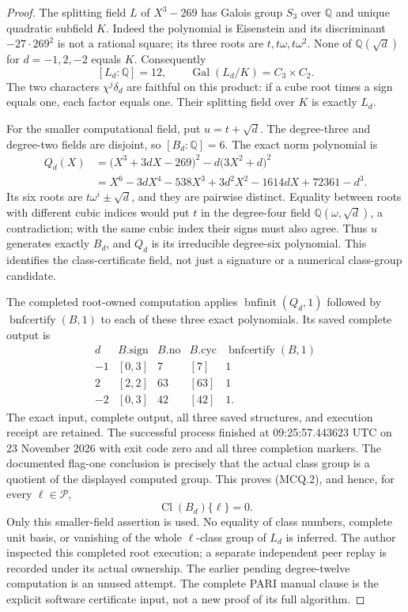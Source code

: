 \begin{proof}
The splitting field $L$ of $X^3-269$ has Galois group $S_3$
over $\mathbb Q$ and unique quadratic subfield $K$.
Indeed the polynomial is Eisenstein and its discriminant
$-27\cdot269^2$ is not a rational square; its three roots are
$t,t\omega,t\omega^2$.  None of $\mathbb Q(\sqrt d)$ for
$d=-1,2,-2$ equals $K$.  Consequently
\[
 [L_d:\mathbb Q]=12,\qquad
 \operatorname{Gal}(L_d/K)=C_3\times C_2.      \tag{MCQ.9}
\]
The two characters $\chi^j\delta_d$ are faithful on this
product: if a cube root times a sign equals one, each factor
equals one.  Their splitting field over $K$ is exactly $L_d$.

For the smaller computational field, put $u=t+\sqrt d$.
The degree-three and degree-two fields are disjoint, so
$[B_d:\mathbb Q]=6$.  The exact norm polynomial is
\[
 \begin{split}
 Q_d(X)&=\bigl(X^3+3dX-269\bigr)^2-d\bigl(3X^2+d\bigr)^2\\
 &=X^6-3dX^4-538X^3+3d^2X^2-1614dX+72361-d^3.
 \end{split}
 \tag{MCQ.10}
\]
Its six roots are $t\omega^i\pm\sqrt d$, and they are
pairwise distinct.  Equality between roots with different
cubic indices would put $t$ in the degree-four field
$\mathbb Q(\omega,\sqrt d)$, a contradiction; with the same
cubic index their signs must also agree.  Thus $u$ generates
exactly $B_d$, and $Q_d$ is its irreducible degree-six
polynomial.  This identifies the class-certificate field,
not just a signature or a numerical class-group candidate.

The completed root-owned computation applies
$\operatorname{bnfinit}(Q_d,1)$ followed by
$\operatorname{bnfcertify}(B,1)$ to each of these three exact
polynomials.  Its saved complete output is
\[
 \begin{array}{c|c|c|c|c}
 d&B.\mathrm{sign}&B.\mathrm{no}&B.\mathrm{cyc}
                      &\operatorname{bnfcertify}(B,1)\\\hline
 -1&[0,3]&7&[7]&1\\
 2&[2,2]&63&[63]&1\\
 -2&[0,3]&42&[42]&1.
 \end{array}
 \tag{MCQ.10a}
\]
The exact input, complete output, all three saved structures,
and execution receipt are retained.  The successful process
finished at 09:25:57.443623 UTC on 23 November 2026 with
exit code zero and all three completion markers.
The documented flag-one conclusion is precisely that the
actual class group is a quotient of the displayed computed
group.  This proves (MCQ.2), and hence, for every
$\ell\in\mathscr P$,
\[
                \operatorname{Cl}(B_d)\{\ell\}=0.
 \tag{MCQ.11}
\]
Only this smaller-field assertion is used.  No equality of
class numbers, complete unit basis, or vanishing of the whole
$\ell$-class group of $L_d$ is inferred.  The author inspected
this completed root execution; a separate independent peer
replay is recorded under its actual ownership.  The earlier
pending degree-twelve computation is an unused attempt.
The complete PARI manual clause is the explicit software
certificate input, not a new proof of its full algorithm.


\end{proof}
